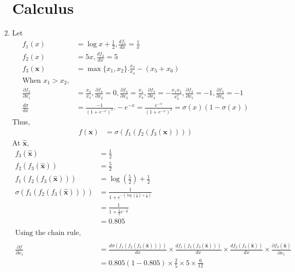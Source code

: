 \documentclass[11pt,english]{article}
\begin{document}
\begin{enumerate}
	\section{Calculus}
	\item Let 
	\begin{align*}
	f_1(x) &= \log x + \frac{1}{2}, \frac{df_1}{dx} = \frac{1}{x} \\
	f_2(x) &= 5x, \frac{df_2}{dx} = 5 \\
	f_3(\mathbf{x}) &= \max \{x_1,x_2\} . \frac{x_3}{x_4} - \left(x_5 + x_6 \right) \\
	\text{When } x_1 > x_2, \\
	\frac{\partial f_3}{\partial x_1} &= \frac{x_3}{x_4}, \frac{\partial f_3}{\partial x_2} = 0, \frac{\partial f_3}{\partial x_3} = \frac{x_1}{x_4}, \frac{\partial f_3}{\partial x_4} = - \frac{x_1 x_3}{x_4^2}, \frac{\partial f_3}{\partial x_5} = -1, \frac{\partial f_3}{\partial x_6} = -1 \\
	\frac{d \sigma}{dx} &= \frac{-1}{(1 + e^{-x})^2} . -e^{-x} = \frac{e^{-x}}{(1 + e^{-x})^2} = \sigma (x) (1 - \sigma (x))
	\end{align*}
	Thus, 
	\begin{align*}
	f(\mathbf{x}) &= \sigma\left(f_1\left(f_2\left(f_3\left(\mathbf{x}\right)\right)\right) \right)
	\end{align*}
	At $\hat{\mathbf{x}}$,
	\begin{align*}
	f_3(\hat{\mathbf{x}}) &= \frac{1}{2} \\
	f_2(f_3(\hat {\mathbf{x}})) &= \frac{5}{2} \\
	f_1(f_2(f_3(\hat{\mathbf{x}}))) &= \log \left(\frac{5}{2}\right) + \frac{1}{2} \\
	\sigma(f_1(f_2(f_3(\hat{\mathbf{x}})))) &= \frac{1}{1 + e^{-\left(\log \left(\frac{5}{2}\right) + \frac{1}{2}\right)}} \\
	&= \frac{1}{1 + \frac{2}{5}e^{-\frac{1}{2}}} \\
	&= 0.805 \\\\
	\text{Using the chain rule,} \\\\
	\frac{\partial f}{\partial x_1} &= \frac{d \sigma(f_1(f_2(f_3(\hat{\mathbf{x}}))))}{dx} \times \frac{d f_1(f_2(f_3(\hat{\mathbf{x}})))}{dx} \times \frac{d f_2(f_3(\hat{\mathbf{x}}))}{dx} \times \frac{\partial f_3(\hat{\mathbf{x}})}{\partial x_1} \\
	&= 0.805(1-0.805) \times \frac{2}{5} \times 5 \times \frac{6}{12} \\

\end{align*}
\end{enumerate}
\end{document}
